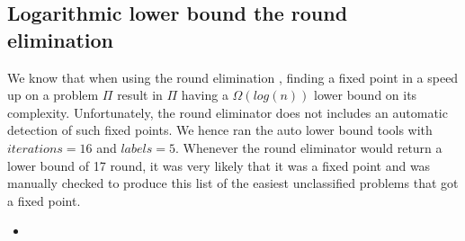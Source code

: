 
\subsection{Logarithmic lower bound the round elimination}
We know that when using the round elimination \cite{round-eliminator}, finding a fixed point in a speed up on a problem $\Pi$ result in $\Pi$ having a $\Omega(log(n))$ lower bound on its complexity. Unfortunately, the round eliminator does not includes an automatic detection of such fixed points. We hence ran the auto lower bound tools with $iterations = 16$ and $labels = 5$. Whenever the round eliminator would return a lower bound of 17 round, it was very likely that it was a fixed point and was manually checked to produce this list of the easiest unclassified problems that got a fixed point.
\begin{itemize}
    \item 
    
\end{itemize}
